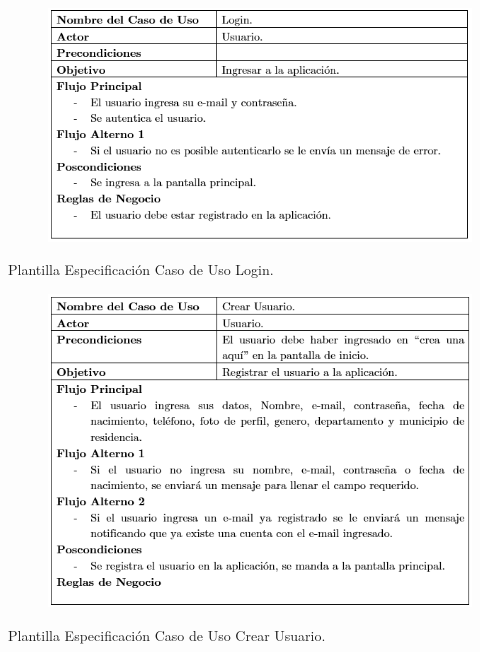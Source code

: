 \documentclass[12pt,letterpaper,openany]{book}
\begin{document}
\begin{table}[H]
\begin{center}
\begin{figure}[H]
\begin{center}
\includegraphics[width=13cm]{./imagenes/PCU/login}
\end{center}
\end{figure}
\end{center}
\caption{Plantilla Especificación Caso de Uso Login.}
\end{table}

\begin{table}[H]
\begin{center}
\begin{figure}[H]
\begin{center}
\includegraphics[width=13cm]{./imagenes/PCU/crear_usuario}
\end{center}
\end{figure}
\end{center}
\caption{Plantilla Especificación Caso de Uso Crear Usuario.}
\end{table}
\end{document}
